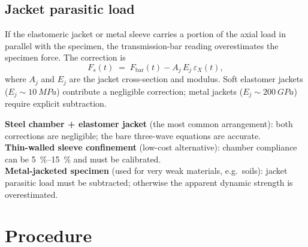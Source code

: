 \documentclass[11pt,a4paper,openany]{book}
\providecommand{\SI}[2]{\qty{#1}{#2}}
\providecommand{\SIrange}[3]{\qtyrange{#1}{#2}{#3}}
\theoremstyle{handbook}
\newcommand{\eps}{\varepsilon}
\begin{document}
\subsection{Jacket parasitic load}

If the elastomeric jacket or metal sleeve carries a portion of the
axial load in parallel with the specimen, the transmission-bar reading
overestimates the specimen force. The correction is
\begin{equation}
  F_s(t) \;=\; F_{\text{bar}}(t) - A_j\,E_j\,\eps_X(t),
  \label{eq:jacket-correction}
\end{equation}
where $A_j$ and $E_j$ are the jacket cross-section and modulus. Soft
elastomer jackets ($E_j\sim\SI{10}{MPa}$) contribute a negligible
correction; metal jackets ($E_j\sim\SI{200}{GPa}$) require explicit
subtraction.

\begin{warningbox}
\textbf{Steel chamber + elastomer jacket} (the most common
arrangement): both corrections are negligible; the bare three-wave
equations are accurate.\\
\textbf{Thin-walled sleeve confinement} (low-cost alternative): chamber
compliance can be \SIrange{5}{15}{\percent} and must be calibrated.\\
\textbf{Metal-jacketed specimen} (used for very weak materials, e.g.\
soils): jacket parasitic load must be subtracted; otherwise the
apparent dynamic strength is overestimated.
\end{warningbox}

\section{Procedure}
\end{document}
